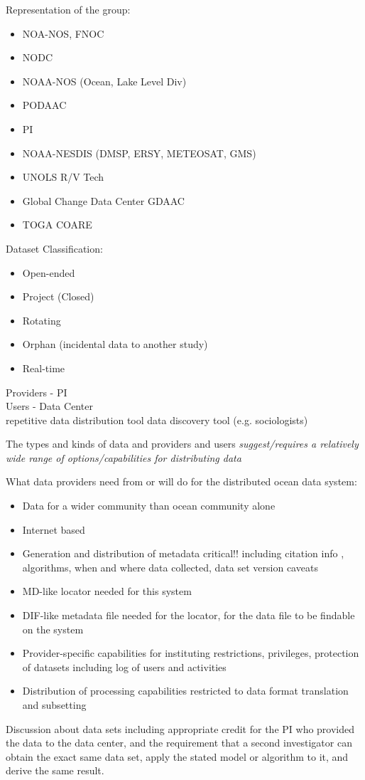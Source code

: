 \medskip
\noindent Representation of the group:
\begin{itemize}
	\item NOA-NOS, FNOC
	\item NODC
	\item NOAA-NOS (Ocean, Lake Level Div)
	\item PODAAC
	\item PI
	\item NOAA-NESDIS (DMSP, ERSY, METEOSAT, GMS)
	\item UNOLS R/V Tech
	\item Global Change Data Center GDAAC
	\item TOGA COARE
\end{itemize}
Dataset Classification:
\begin{itemize}
	\item Open-ended
	\item Project (Closed)
	\item Rotating
	\item Orphan (incidental data to another study)
	\item Real-time
\end{itemize}

Providers - PI\\
Users -	Data Center\\
			repetitive data distribution tool
			data discovery tool (e.g. sociologists)

The types and kinds of data and providers and users {\em suggest/requires a 
relatively wide range of options/capabilities for distributing data}

What data providers need from or will do for the distributed ocean data 
system:
\begin{itemize}
   	\item Data for a wider community than ocean community alone
   	\item Internet based
	\item Generation and distribution of metadata critical!! including
citation info , algorithms, when and where data collected, data set version
caveats 
	\item MD-like locator needed for this system
	\item DIF-like metadata file needed for the locator, for the data
file to be findable on the system
	\item Provider-specific capabilities for instituting restrictions,
privileges, protection of datasets including log of users and activities
	\item Distribution of processing capabilities restricted to data
format translation and subsetting
\end{itemize}
\medskip
Discussion about data sets including appropriate credit for the PI who 
provided the data to the data center, and the requirement that a second 
investigator can obtain the exact same data set, apply the stated model or 
algorithm to it, and derive the same result.



